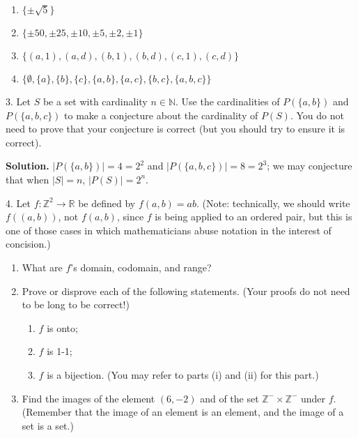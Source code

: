 \documentclass[10pt,]{book}
\theoremstyle{plain}
\theoremstyle{definition}
\theoremstyle{definition}
\theoremstyle{definition}
\theoremstyle{definition}
\numberwithin{equation}{section}
\def\Z{\mathbb{Z}}
\def\R{\mathbb{R}}
\def\N{\mathbb{N}}
\begin{document}
\begin{exerciselist}
\leavevmode%
\begin{enumerate}[label=(\alph*)]
\item\hypertarget{li-35}{}\(\{\pm\sqrt{5}\}\)%
\item\hypertarget{li-36}{}\(\{\pm 50, \pm 25, \pm 10, \pm 5, \pm 2, \pm 1\}\)%
\item\hypertarget{li-37}{}\(\{(a,1),(a,d), (b,1),(b,d),(c,1),(c,d)\}\)%
\item\hypertarget{li-38}{}\(\{\emptyset, \{a\}, \{b\},
\{c\},\{a,b\},\{a,c\},\{b,c\}, \{a,b,c\}\}\)%
\end{enumerate}
%
\item[3.]\hypertarget{exercise-3}{}Let \(S\) be a set with cardinality \(n\in \N\). Use the cardinalities of \(P(\{a,b\})\) and \(P(\{a,b,c\})\) to make a conjecture about the cardinality of \(P(S)\). You do not need to prove that your conjecture is correct (but you should try to ensure it is correct).%
\par\smallskip
\par\smallskip
\noindent\textbf{Solution.}\hypertarget{solution-3}{}\quad
\(|P(\{a,b\})|=4=2^2\) and \(|P(\{a,b,c\})|=8=2^3\); we may conjecture that when \(|S|=n\), \(|P(S)|=2^n\).%
\item[4.]\hypertarget{exercise-4}{}Let \(f: \Z^2 \to \R\) be defined by \(f(a,b)=ab\). (Note: technically, we should write \(f((a,b))\), not \(f(a,b)\), since \(f\) is being applied to an ordered pair, but this is one of those cases in which mathematicians abuse notation in the interest of concision.) \leavevmode%
\begin{enumerate}[label=(\alph*)]
\item\hypertarget{li-39}{}What are \(f\)'s domain, codomain, and range?%
\item\hypertarget{li-40}{}Prove or disprove each of the following statements. (Your proofs do not need to be long to be correct!) %
\begin{enumerate}[label=\roman*.]
\item\hypertarget{li-41}{}\(f\) is onto;%
\item\hypertarget{li-42}{}\(f\) is 1-1;%
\item\hypertarget{li-43}{}\(f\) is a bijection. (You may refer to parts (i) and (ii) for this part.)%
\end{enumerate}
%
\item\hypertarget{li-44}{}Find the images of the element \((6,-2)\) and of the set \(\Z^- \times \Z^-\) under \(f\). (Remember that the image of an element is an element, and the image of a set is a set.)%

\end{enumerate}
\end{exerciselist}
\end{document}
